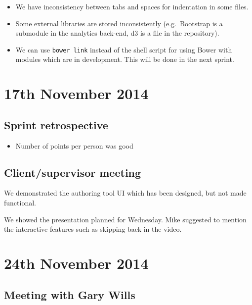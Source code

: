 \begin{itemize}
\itemsep1pt\parskip0pt
\item
  We have inconsistency between tabs and spaces for indentation in some
  files.
\item
  Some external libraries are stored inconsistently (e.g.~Bootstrap is a
  submodule in the analytics back-end, d3 is a file in the repository).
\item
  We can use \texttt{bower link} instead of the shell script for using
  Bower with modules which are in development. This will be done in the
  next sprint.
\end{itemize}

\section{17th November 2014}\label{Minutes:2014-11-17}

\subsection{Sprint retrospective}

\begin{itemize}
\itemsep1pt\parskip0pt
\item
  Number of points per person was good
\end{itemize}

\subsection{Client/supervisor meeting}

We demonstrated the authoring tool UI which has been designed, but not
made functional.

We showed the presentation planned for Wednesday. Mike suggested to
mention the interactive features such as skipping back in the video.

\section{24th November 2014}\label{Minutes:2014-11-24}

\subsection{Meeting with Gary Wills}

